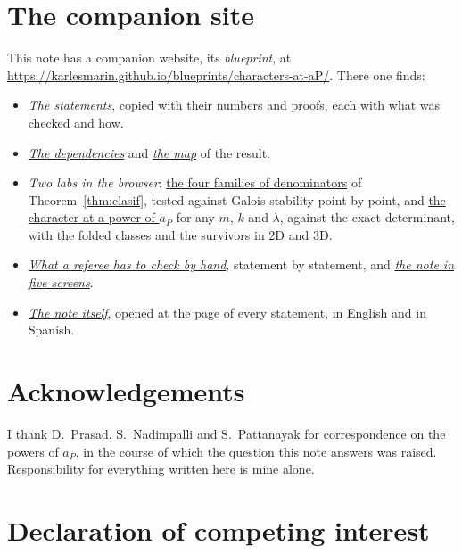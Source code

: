 \documentclass[11pt,a4paper]{article}
\theoremstyle{definition}
\begin{document}
\section*{The companion site}
This note has a companion website, its \emph{blueprint}, at \url{https://karlesmarin.github.io/blueprints/characters-at-aP/}. There one finds:
\begin{itemize}
\item \href{https://karlesmarin.github.io/blueprints/characters-at-aP/index.html\#thm:crit}{\emph{The statements}}, copied with their numbers and proofs, each with what was checked and how.
\item \href{https://karlesmarin.github.io/blueprints/characters-at-aP/dep_graph_document.html}{\emph{The dependencies}} and \href{https://karlesmarin.github.io/blueprints/characters-at-aP/mapa.html}{\emph{the map}} of the result.
\item \emph{Two labs in the browser}: \href{https://karlesmarin.github.io/blueprints/characters-at-aP/index.html?lab=thm\%3Aclasif\#thm:clasif}{the four families of denominators} of Theorem~\ref{thm:clasif}, tested against Galois stability point by point, and \href{https://karlesmarin.github.io/blueprints/characters-at-aP/index.html?lab=thm\%3Asigno\#thm:signo}{the character at a power of $a_P$} for any $m$, $k$ and $\lambda$, against the exact determinant, with the folded classes and the survivors in 2D and 3D.
\item \href{https://karlesmarin.github.io/blueprints/characters-at-aP/referee.html}{\emph{What a referee has to check by hand}}, statement by statement, and \href{https://karlesmarin.github.io/blueprints/characters-at-aP/tour.html}{\emph{the note in five screens}}.
\item \href{https://karlesmarin.github.io/blueprints/characters-at-aP/pdf.html}{\emph{The note itself}}, opened at the page of every statement, in English and in Spanish.
\end{itemize}

\section*{Acknowledgements}

\noindent I thank D.~Prasad, S.~Nadimpalli and S.~Pattanayak for correspondence on the powers of
$a_P$, in the course of which the question this note answers was raised. Responsibility for everything written here is
mine alone.

\section*{Declaration of competing interest}
\end{document}
